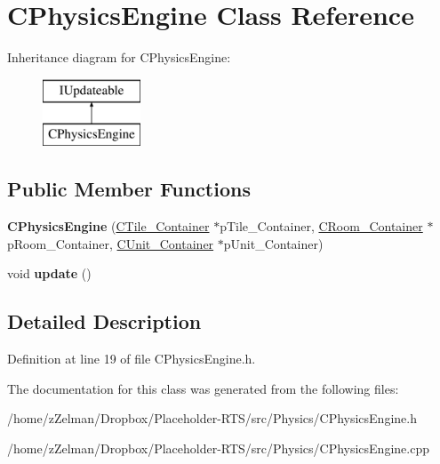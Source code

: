 \hypertarget{classCPhysicsEngine}{\section{C\-Physics\-Engine Class Reference}
\label{classCPhysicsEngine}
}
Inheritance diagram for C\-Physics\-Engine\-:\begin{figure}[H]
\begin{center}
\leavevmode
\includegraphics[height=2.000000cm]{classCPhysicsEngine}
\end{center}
\end{figure}
\subsection*{Public Member Functions}
\begin{DoxyCompactItemize}
\item 
\hypertarget{classCPhysicsEngine_a33fb6680b9f22590802f613f1c707abd}{{\bfseries C\-Physics\-Engine} (\hyperlink{classCTile__Container}{C\-Tile\-\_\-\-Container} $\ast$p\-Tile\-\_\-\-Container, \hyperlink{classCRoom__Container}{C\-Room\-\_\-\-Container} $\ast$p\-Room\-\_\-\-Container, \hyperlink{classCUnit__Container}{C\-Unit\-\_\-\-Container} $\ast$p\-Unit\-\_\-\-Container)}\label{classCPhysicsEngine_a33fb6680b9f22590802f613f1c707abd}

\item 
\hypertarget{classCPhysicsEngine_abc493897bbdb15e6787a25478730f1f5}{void {\bfseries update} ()}\label{classCPhysicsEngine_abc493897bbdb15e6787a25478730f1f5}

\end{DoxyCompactItemize}


\subsection{Detailed Description}


Definition at line 19 of file C\-Physics\-Engine.\-h.



The documentation for this class was generated from the following files\-:\begin{DoxyCompactItemize}
\item 
/home/z\-Zelman/\-Dropbox/\-Placeholder-\/\-R\-T\-S/src/\-Physics/C\-Physics\-Engine.\-h\item 
/home/z\-Zelman/\-Dropbox/\-Placeholder-\/\-R\-T\-S/src/\-Physics/C\-Physics\-Engine.\-cpp\end{DoxyCompactItemize}
